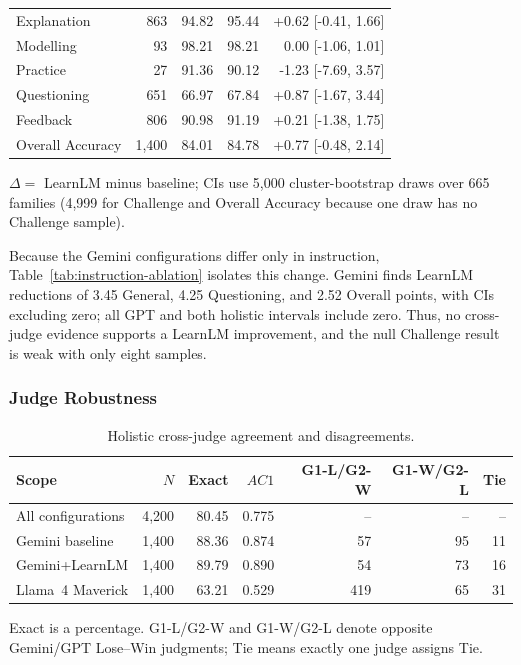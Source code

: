 \documentclass[conference]{IEEEtran}
\begin{document}
\begin{table}[t]
\begin{tabular}{lrrrr}
Explanation & 863 & 94.82 & 95.44 & +0.62 [-0.41, 1.66] \\
Modelling & 93 & 98.21 & 98.21 & 0.00 [-1.06, 1.01] \\
Practice & 27 & 91.36 & 90.12 & -1.23 [-7.69, 3.57] \\
Questioning & 651 & 66.97 & 67.84 & +0.87 [-1.67, 3.44] \\
Feedback & 806 & 90.98 & 91.19 & +0.21 [-1.38, 1.75] \\
Overall Accuracy & 1,400 & 84.01 & 84.78 & +0.77 [-0.48, 2.14] \\
\hline
\end{tabular}
\footnotesize \(\Delta=\) LearnLM minus baseline; CIs use 5,000 cluster-bootstrap draws over 665 families (4,999 for Challenge and Overall Accuracy because one draw has no Challenge sample).
\end{table}

Because the Gemini configurations differ only in instruction,
Table~\ref{tab:instruction-ablation} isolates this change. Gemini finds
LearnLM reductions of 3.45 General, 4.25 Questioning, and 2.52 Overall points,
with CIs excluding zero; all GPT and both holistic intervals include zero.
Thus, no cross-judge evidence supports a LearnLM improvement, and the null
Challenge result is weak with only eight samples.

\subsubsection{Judge Robustness}

\begin{table}[t]
\caption{Holistic cross-judge agreement and disagreements.}
\label{tab:holistic-agreement}
\label{tab:directional-disagreement}
\centering
\scriptsize
\setlength{\tabcolsep}{1.5pt}
\renewcommand{\arraystretch}{0.94}
\begin{tabular}{@{}lrrrrrr@{}}
\hline
Scope & \(N\) & Exact & \(AC1\) & G1-L/G2-W & G1-W/G2-L & Tie \\
\hline
All configurations & 4,200 & 80.45 & 0.775 & -- & -- & -- \\
Gemini baseline & 1,400 & 88.36 & 0.874 & 57 & 95 & 11 \\
Gemini+LearnLM & 1,400 & 89.79 & 0.890 & 54 & 73 & 16 \\
Llama~4 Maverick & 1,400 & 63.21 & 0.529 & 419 & 65 & 31 \\
\hline
\end{tabular}
\footnotesize Exact is a percentage. G1-L/G2-W and G1-W/G2-L denote opposite Gemini/GPT Lose--Win judgments; Tie means exactly one judge assigns Tie.
\end{table}
\end{document}
